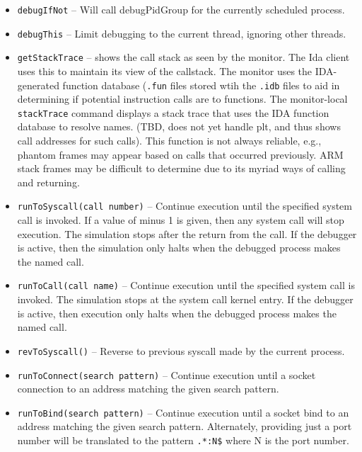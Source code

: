 \documentclass[titlepage]{article}
\begin{document}
\begin{itemize}
\item {\tt debugIfNot} -- Will call debugPidGroup for the currently scheduled process.

\item {\tt debugThis} -- Limit debugging to the current thread, ignoring other threads.

\item {\tt getStackTrace} – shows the call stack as seen by the monitor.  The Ida client uses this to maintain its view of the callstack.  The monitor
uses the IDA-generated function database ({\tt .fun} files stored wtih the {\tt .idb} files to aid in determining if 
potential instruction calls are to functions.  The monitor-local {\tt stackTrace} command displays a
stack trace that uses the IDA function database to resolve names.  (TBD, does not yet handle plt, and thus shows call addresses for such calls).
This function is not always reliable, e.g., phantom frames may appear based on calls that occurred previously. ARM stack frames may be
difficult to determine due to its myriad ways of calling and returning. 

\item {\tt runToSyscall(call number)} – Continue execution until the specified system call is invoked.  If a value of minus 1 is given, then any system call will stop execution.  The simulation stops after the return from the call.  If the debugger is active, then the simulation only halts when the debugged process makes the named call.

\item {\tt runToCall(call name)} – Continue execution until the specified system call is invoked.  The simulation stops at the system call kernel entry.
If the debugger is active, then execution only halts when the debugged process makes the named call.

\item {\tt revToSyscall()} -- Reverse to previous syscall made by the current process.

\item {\tt runToConnect(search pattern)} – Continue execution until a socket connection to an address matching the given search pattern.

\item {\tt runToBind(search pattern)} – Continue execution until a socket bind to an address matching the given search pattern.  Alternately, providing just
a port number will be translated to the pattern {\tt .*:N\$} where N is the port number.


\end{itemize}
\end{document}

